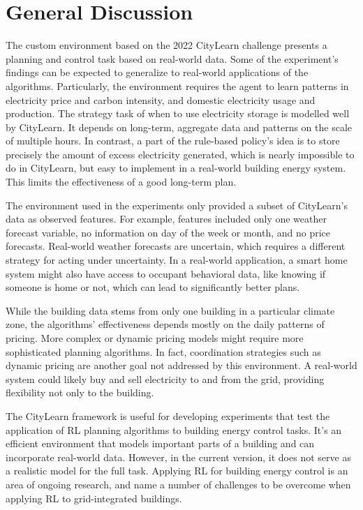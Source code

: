 \section{General Discussion}
The custom environment based on the 2022 CityLearn challenge presents a planning and control task based on real-world data.
Some of the experiment's findings can be expected to generalize to real-world applications of the algorithms.
Particularly, the environment requires the agent to learn patterns in electricity price and carbon intensity, and domestic electricity usage and production.
The strategy task of when to use electricity storage is modelled well by CityLearn.
It depends on long-term, aggregate data and patterns on the scale of multiple hours.
In contrast, a part of the rule-based policy's idea is to store precisely the amount of excess electricity generated, which is nearly impossible to do in CityLearn, but easy to implement in a real-world building energy system.
This limits the effectiveness of a good long-term plan.

The environment used in the experiments only provided a subset of CityLearn's data as observed features.
For example, features included only one weather forecast variable, no information on day of the week or month, and no price forecasts.
Real-world weather forecasts are uncertain, which requires a different strategy for acting under uncertainty.
In a real-world application, a smart home system might also have access to occupant behavioral data, like knowing if someone is home or not, which can lead to significantly better plans.

While the building data stems from only one building in a particular climate zone, the algorithms' effectiveness depends mostly on the daily patterns of pricing.
More complex or dynamic pricing models might require more sophisticated planning algorithms.
In fact, coordination strategies such as dynamic pricing are another goal not addressed by this environment.
A real-world system could likely buy and sell electricity to and from the grid, providing flexibility not only to the building.

The CityLearn framework is useful for developing experiments that test the application of RL planning algorithms to building energy control tasks.
It's an efficient environment that models important parts of a building and can incorporate real-world data.
However, in the current version, it does not serve as a realistic model for the full task.
Applying RL for building energy control is an area of ongoing research, and \cite{nweye2022RealworldChallengesMultiagent} name a number of challenges to be overcome when applying RL to grid-integrated buildings.

